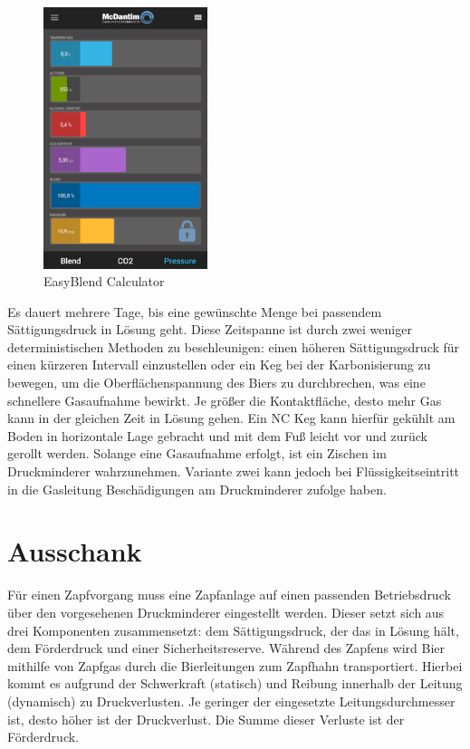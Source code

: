 \documentclass[a4paper,parskip=half]{scrartcl}
\begin{document}
\begin{figure}[h]
\centering
\includegraphics[width=4.8cm]{images/mcdantim.jpg}
\caption{EasyBlend Calculator}
\label{fig:mcdantim}
\end{figure}

Es dauert mehrere Tage, bis eine gewünschte  Menge bei passendem Sättigungsdruck in Lösung geht. Diese Zeitspanne ist durch zwei weniger deterministischen Methoden zu beschleunigen: einen höheren Sättigungsdruck für einen kürzeren Intervall einzustellen oder ein Keg bei der Karbonisierung zu bewegen, um die Oberflächenspannung des Biers zu durchbrechen, was eine schnellere Gasaufnahme bewirkt. Je größer die Kontaktfläche, desto mehr Gas kann in der gleichen Zeit in Lösung gehen. Ein NC Keg kann hierfür gekühlt am Boden in horizontale Lage gebracht und mit dem Fuß leicht vor und zurück gerollt werden. Solange eine Gasaufnahme erfolgt, ist ein Zischen im Druckminderer wahrzunehmen. Variante zwei kann jedoch bei Flüssigkeitseintritt in die Gasleitung Beschädigungen am Druckminderer zufolge haben.

\section*{Ausschank}

Für einen Zapfvorgang muss eine Zapfanlage auf einen passenden Betriebsdruck über den vorgesehenen Druckminderer eingestellt werden. Dieser setzt sich aus drei Komponenten zusammensetzt: dem Sättigungsdruck, der das  in Lösung hält, dem Förderdruck und einer Sicherheitsreserve. Während des Zapfens wird Bier mithilfe von Zapfgas durch die Bierleitungen zum Zapfhahn transportiert. Hierbei kommt es aufgrund der Schwerkraft (statisch) und Reibung innerhalb der Leitung (dynamisch) zu Druckverlusten. Je geringer der eingesetzte Leitungsdurchmesser ist, desto höher ist der Druckverlust. Die Summe dieser Verluste ist der Förderdruck. \autocite{Krueger2015}
\end{document}
